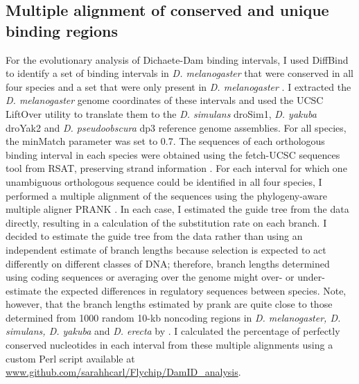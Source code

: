 \subsection{Multiple alignment of conserved and unique binding regions}
For the evolutionary analysis of Dichaete-Dam binding intervals, I used DiffBind to identify a set of binding intervals in \emph{D. melanogaster} that were conserved in all four species and a set that were only present in \emph{D. melanogaster} \citep{ross-innes_differential_2012}. I extracted the \emph{D. melanogaster} genome coordinates of these intervals and used the UCSC LiftOver utility to translate them to the \emph{D. simulans} droSim1, \emph{D. yakuba} droYak2 and \emph{D. pseudoobscura} dp3 reference genome assemblies. For all species, the minMatch parameter was set to 0.7. The sequences of each orthologous binding interval in each species were obtained using the fetch-UCSC sequences tool from RSAT, preserving strand information \citep{thomas-chollier_rsat_2011}. For each interval for which one unambiguous orthologous sequence could be identified in all four species, I performed a multiple alignment of the sequences using the phylogeny-aware multiple aligner PRANK \citep{loytynoja_algorithm_2005,loytynoja_phylogeny-aware_2008}. In each case, I estimated the guide tree from the data directly, resulting in a calculation of the substitution rate on each branch. I decided to estimate the guide tree from the data rather than using an independent estimate of branch lengths because selection is expected to act differently on different classes of DNA; therefore, branch lengths determined using coding sequences or averaging over the genome might over- or under-estimate the expected differences in regulatory sequences between species. Note, however, that the branch lengths estimated by prank are quite close to those determined from 1000 random 10-kb noncoding regions in \emph{D. melanogaster, D. simulans, D. yakuba} and \emph{D. erecta} by \citet{moses_large-scale_2006}. I calculated the percentage of perfectly conserved nucleotides in each interval from these multiple alignments using a custom Perl script available at \url{www.github.com/sarahhcarl/Flychip/DamID_analysis}.

